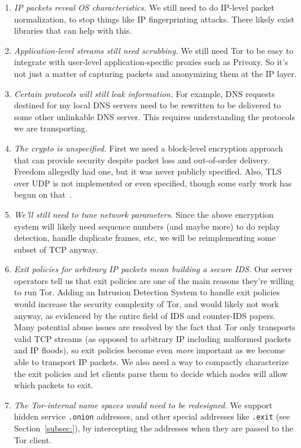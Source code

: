 \documentclass{llncs}
\begin{document}
\begin{enumerate}
\setlength{\itemsep}{0mm}
\setlength{\parsep}{0mm}
\item \emph{IP packets reveal OS characteristics.} We still need to do
IP-level packet normalization, to stop things like IP fingerprinting
attacks. There likely exist libraries that can help with this.
\item \emph{Application-level streams still need scrubbing.} We still need
Tor to be easy to integrate with user-level application-specific proxies
such as Privoxy. So it's not just a matter of capturing packets and
anonymizing them at the IP layer.
\item \emph{Certain protocols will still leak information.} For example,
DNS requests destined for my local DNS servers need to be rewritten
to be delivered to some other unlinkable DNS server. This requires
understanding the protocols we are transporting.
\item \emph{The crypto is unspecified.} First we need a block-level encryption
approach that can provide security despite
packet loss and out-of-order delivery. Freedom allegedly had one, but it was
never publicly specified. %
Also, TLS over UDP is not implemented or even
specified, though some early work has begun on that~\cite{dtls}.
\item \emph{We'll still need to tune network parameters}. Since the above
encryption system will likely need sequence numbers (and maybe more) to do
replay detection, handle duplicate frames, etc, we will be reimplementing
some subset of TCP anyway.
\item \emph{Exit policies for arbitrary IP packets mean building a secure
IDS.}  Our server operators tell us that exit policies are one of
the main reasons they're willing to run Tor.
Adding an Intrusion Detection System to handle exit policies would
increase the security complexity of Tor, and would likely not work anyway,
as evidenced by the entire field of IDS and counter-IDS papers. Many
potential abuse issues are resolved by the fact that Tor only transports
valid TCP streams (as opposed to arbitrary IP including malformed packets
and IP floods), so exit policies become even \emph{more} important as
we become able to transport IP packets. We also need a way to compactly
characterize the exit policies and let clients parse them to decide
which nodes will allow which packets to exit.
\item \emph{The Tor-internal name spaces would need to be redesigned.} We
support hidden service {\tt{.onion}} addresses, and other special addresses
like {\tt{.exit}} (see Section~\ref{subsec:}), by intercepting the addresses
when they are passed to the Tor client.
\end{enumerate}
\end{document}

